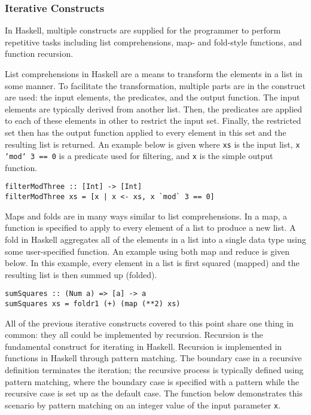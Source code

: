 \documentclass[titlepage,12pt]{article}
\begin{document}
\subsubsection{Iterative Constructs}

In Haskell, multiple constructs are supplied for the programmer to perform repetitive tasks including
list comprehensions, map- and fold-style functions, and function recursion.

List comprehensions in Haskell are a means to transform the elements in a list in some manner.
To facilitate the transformation, multiple parts are in the construct are used: the input elements, the
predicates, and the output function.  The input elements are typically derived from another list.  Then,
the predicates are applied to each of these elements in other to restrict the input set.  Finally, the
restricted set then has the output function applied to every element in this set and the resulting list
is returned.  An example below is given where \texttt{xs} is the input list, \texttt{x `mod` 3 == 0} is
a predicate used for filtering, and \texttt{x} is the simple output function.

\begin{verbatim}
filterModThree :: [Int] -> [Int]
filterModThree xs = [x | x <- xs, x `mod` 3 == 0]
\end{verbatim}

Maps and folds are in many ways similar to list comprehensions.  In a map, a function is specified to apply to
every element of a list to produce a new list.  A fold in Haskell aggregates all of the elements in a list into
a single data type using some user-specified function.  An example using both map and reduce is given below.
In this example, every element in a list is first squared (mapped) and the resulting list is then summed up (folded).

\begin{verbatim}
sumSquares :: (Num a) => [a] -> a
sumSquares xs = foldr1 (+) (map (**2) xs)
\end{verbatim}

All of the previous iterative constructs covered to this point share one thing in common:
they all could be implemented by recursion.  Recursion is the fundamental construct for iterating
in Haskell.  Recursion is implemented in functions in Haskell through pattern matching.  The boundary
case in a recursive definition terminates the iteration; the recursive process is typically defined using pattern matching,
where the boundary case is specified with a pattern while the recursive case is set up as the default case.
The function below demonstrates this scenario by pattern matching on an integer value of the input parameter \texttt{x}.
\end{document}
